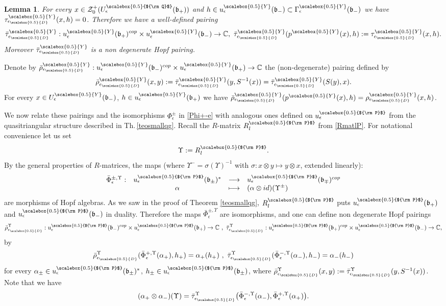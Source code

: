 \documentclass[11pt]{amsart}
\newtheorem{lem}[teo]{Lemma}
\newcommand{\fonc}[5]{                     %
            \begin{array}{rcll}#1 :& #2 & \longrightarrow & #3 \\   %
                         &#4 &\longmapsto & #5          %
            \end{array}}
\newcommand{\e}{\epsilon}
\newcommand{\mc}{\mathbb{C}}
\newcommand{\eD}{\epsilon_{\scalebox{0.5}{D}}}
\newcommand{\Q}{{\scalebox{0.5}{${\rm Q}$}}}
\newcommand{\Y}{{\scalebox{0.5}{Y}}}
\newcommand{\Pup}{{\scalebox{0.5}{${\rm P}$}}}
\begin{document}
\begin{lem}\label{basicqpairingsept25} For every $x\in \mathcal{Z}_0^+(U_\e^\Q(\mathfrak{b}_+))$ and $h\in u_\e^\Y(\mathfrak{b}_-)\subset \Gamma_\e^\Y(\mathfrak{b}_-)$ we have $\tau_{\eD}^\Y(x,h)=0$. Therefore we have a well-defined pairing
$$\bar{\tau}_{\eD}^\Y: u_\e^\Y(\mathfrak{b}_+)^{cop}\times u_\e^\Y(\mathfrak{b}_-)\to \mc, \ \bar{\tau}_{\eD}^\Y(p^\Y(x),h) := \tau_{\eD}^\Y(x,h).$$
Moreover $\bar{\tau}_{\eD}^\Y$ is a non degenerate Hopf pairing.
\end{lem}
Denote by $\bar{\rho}_{\eD}^\Y: u_\e^\Y(\mathfrak{b}_-)^{cop}\times u_\e^\Y(\mathfrak{b}_+)\to \mc$ the (non-degenerate) pairing defined by $$\bar{\rho}_{\eD}^\Y(x,y) := \bar{\tau}_{\eD}^\Y(y,S^{-1}(x)) = \bar{\tau}_{\eD}^\Y(S(y),x).$$
For every $x\in U_\e^\Y(\mathfrak{b}_-)$, $h\in u_\e^\Y(\mathfrak{b}_+)$ we have $\bar{\rho}_{\eD}^\Y(p^\Y(x),h)  = \rho_{\eD}^\Y(x,h)$.

We now relate these pairings and the isomorphisms $\Phi_\e^\pm$ in \eqref{Phi+-e} with analogous ones defined on $u_\e^\Pup$ from the quasitriangular structure described in Th.\,\ref{teosmallqg}. Recall the $R$-matrix $R_l^\Pup$ from \eqref{RmatlP}. For notational convenience let us set
$$\Upsilon:= R_l^\Pup.$$
By the general properties of $R$-matrices, the maps (where $\Upsilon^-=\sigma(\Upsilon)^{-1}$ with $\sigma\colon x\otimes y\mapsto y\otimes x$, extended linearly):
\begin{equation}\label{phipm}
\fonc{\bar\Phi_\e^{\pm, \Upsilon}}{u_\e^\Pup(\mathfrak{b}_\pm)^*}{u_\e^\Pup(\mathfrak{b}_\mp)^{cop}}{\alpha}{(\alpha \otimes id)(\Upsilon^\pm)}
\end{equation}
are morphisms of Hopf algebras. As we saw in the proof of Theorem \ref{teosmallqg}, $R_l^\Pup$ puts $u_\e^\Pup(\mathfrak{b}_+)$ and $u_\e^\Pup(\mathfrak{b}_-)$ in duality. Therefore the maps $\bar\Phi_\e^{\pm, \Upsilon}$ are isomorphisms, and one can define non degenerate Hopf pairings
\begin{equation*}
\bar{\rho}_{\eD}^\Upsilon: u_\e^\Pup(\mathfrak{b}_-)^{cop}\times u_\e^\Pup(\mathfrak{b}_+)\to \mc\ ,\ \bar{\tau}_{\eD}^\Upsilon: u_\e^\Pup(\mathfrak{b}_+)^{cop}\times u_\e^\Pup(\mathfrak{b}_-)\to \mc, 
\end{equation*} 
by
\begin{equation}\label{rhoRdefsept25}
\bar{\rho}_{\eD}^\Upsilon(\bar\Phi_\e^{+,\Upsilon}(\alpha_+), h_+) = \alpha_+(h_+)\ ,\  \bar{\tau}_{\eD}^\Upsilon(\bar\Phi_\e^{-,\Upsilon}(\alpha_-), h_-) = \alpha_-(h_-)
\end{equation}
for every $\alpha_\pm\in u_\e^\Pup(\mathfrak{b}_\pm)^*$, $h_\pm\in u_\e^\Pup(\mathfrak{b}_\pm)$, where $\bar{\rho}_{\eD}^\Upsilon (x,y) := \bar{\tau}_{\eD}^\Upsilon (y,S^{-1}(x))$. Note that we have
\[ (\alpha_+\otimes \alpha_-)(\Upsilon) = \bar{\tau}_{\eD}^\Upsilon\bigl( \bar\Phi_\e^{-,\Upsilon}(\alpha_-), \bar\Phi_\e^{+,\Upsilon}(\alpha_+) \bigr). \] 
\end{document}
